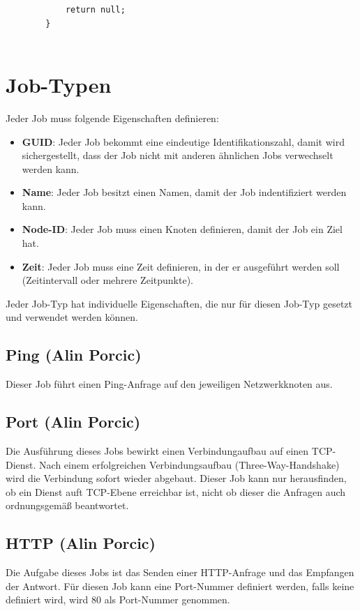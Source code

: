 \documentclass[12pt,a4paper]{report}
\begin{document}
\begin{onehalfspace}
\begin{lstlisting}
            return null;
        }
  
\end{lstlisting}

\section{Job-Typen}

Jeder Job muss folgende Eigenschaften definieren:\\

\begin{itemize}
\item \textbf{GUID}: Jeder Job bekommt eine eindeutige Identifikationszahl, damit wird sichergestellt, dass der Job nicht mit anderen ähnlichen Jobs verwechselt werden kann.
\item \textbf{Name}: Jeder Job besitzt einen Namen, damit der Job indentifiziert werden kann.
\item \textbf{Node-ID}: Jeder Job muss einen Knoten definieren, damit der Job ein Ziel hat.
\item \textbf{Zeit}: Jeder Job muss eine Zeit definieren, in der er ausgeführt werden soll (Zeitintervall oder mehrere Zeitpunkte).
\end{itemize}

Jeder Job-Typ hat individuelle Eigenschaften, die nur für diesen Job-Typ gesetzt und verwendet werden können.

\subsection{Ping (Alin Porcic)} Dieser Job führt einen Ping-Anfrage auf den jeweiligen Netzwerkknoten aus.

\subsection{Port (Alin Porcic)} Die Ausführung dieses Jobs bewirkt einen Verbindungaufbau auf einen TCP-Dienst. Nach einem erfolgreichen Verbindungsaufbau (Three-Way-Handshake) wird die Verbindung sofort wieder abgebaut. Dieser Job kann nur herausfinden, ob ein Dienst auft TCP-Ebene erreichbar ist, nicht ob dieser die Anfragen auch ordnungsgemäß beantwortet.

\subsection{HTTP (Alin Porcic)}\label{ssec:httpcheck} Die Aufgabe dieses Jobs ist das Senden einer HTTP-Anfrage und das Empfangen der Antwort. Für diesen Job kann eine Port-Nummer definiert werden, falls keine definiert wird, wird 80 als Port-Nummer genommen.


\end{onehalfspace}
\end{document}
